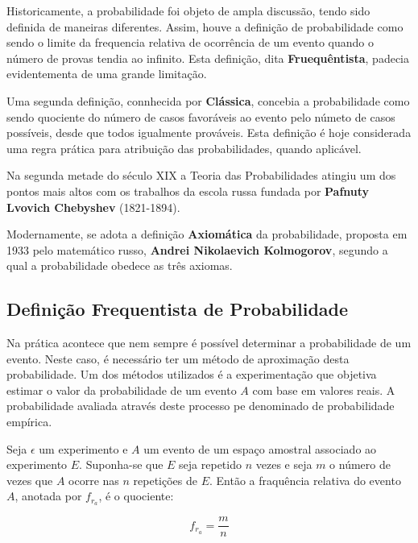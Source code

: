 \inic Historicamente, a probabilidade foi objeto de ampla discussão, tendo sido definida de maneiras diferentes. Assim, houve a definição de probabilidade como sendo o limite da frequencia relativa de ocorrência de um evento quando o número de provas tendia ao infinito. Esta definição, dita \textbf{Fruequêntista}, padecia evidentementa de uma grande limitação.\vskip0.3cm
 
\inic Uma segunda definição, connhecida por \textbf{Clássica}, concebia a probabilidade como sendo quociente do número de casos favoráveis ao evento pelo númeto de casos possíveis, desde que todos igualmente prováveis. Esta definição é hoje considerada uma regra prática para atribuição das probabilidades, quando aplicável.\vskip0.3cm

\inic Na segunda metade do século XIX a Teoria das Probabilidades atingiu um dos pontos mais altos com os trabalhos da escola russa fundada por \textbf{Pafnuty Lvovich Chebyshev} (1821-1894).\vskip0.3cm
 
\inic Modernamente, se adota a definição \textbf{Axiomática} da probabilidade, proposta em 1933 pelo matemático russo, \textbf{Andrei Nikolaevich Kolmogorov}, segundo a qual a probabilidade obedece as três axiomas.
 




 
\subsection{Definição Frequentista de Probabilidade}

\inic Na prática acontece que nem sempre é possível determinar a probabilidade de um evento. Neste caso, é necessário ter um método de aproximação desta probabilidade. Um dos métodos utilizados é a experimentação que objetiva estimar o valor da probabilidade de um evento $A$ com base em valores reais. A probabilidade avaliada através deste processo pe denominado de probabilidade empírica.\vskip0.3cm

\inic Seja $\epsilon$ um experimento e $A$ um evento de um espaço amostral associado ao experimento $E$. Suponha-se que $E$ seja repetido $n$ vezes e seja $m$ o número de vezes que $A$ ocorre nas $n$ repetições de $E$. Então a fraquência relativa do evento $A$, anotada por $f_{r_{a}}$, é o quociente:
 
\begin{equation}
     f_{r_{a}}= \frac{m}{n}
\end{equation}
 
